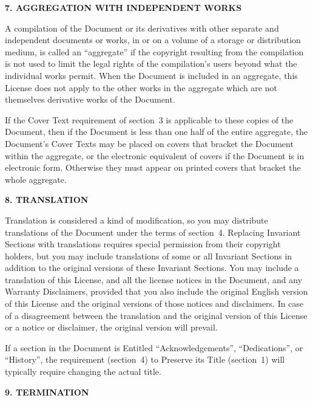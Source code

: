 \documentclass[a4paper,spanish,12pt]{book}
\begin{document}
\begin{center}
{\Large\bf 7. AGGREGATION WITH INDEPENDENT WORKS\par}
\end{center}


A compilation of the Document or its derivatives with other separate
and independent documents or works, in or on a volume of a storage or
distribution medium, is called an ``aggregate'' if the copyright
resulting from the compilation is not used to limit the legal rights
of the compilation's users beyond what the individual works permit.
When the Document is included in an aggregate, this License does not
apply to the other works in the aggregate which are not themselves
derivative works of the Document.

If the Cover Text requirement of section~3 is applicable to these
copies of the Document, then if the Document is less than one half of
the entire aggregate, the Document's Cover Texts may be placed on
covers that bracket the Document within the aggregate, or the
electronic equivalent of covers if the Document is in electronic form.
Otherwise they must appear on printed covers that bracket the whole
aggregate.


\begin{center}
{\Large\bf 8. TRANSLATION\par}
\end{center}


Translation is considered a kind of modification, so you may
distribute translations of the Document under the terms of section~4.
Replacing Invariant Sections with translations requires special
permission from their copyright holders, but you may include
translations of some or all Invariant Sections in addition to the
original versions of these Invariant Sections.  You may include a
translation of this License, and all the license notices in the
Document, and any Warranty Disclaimers, provided that you also include
the original English version of this License and the original versions
of those notices and disclaimers.  In case of a disagreement between
the translation and the original version of this License or a notice
or disclaimer, the original version will prevail.

If a section in the Document is Entitled ``Acknowledgements'',
``Dedications'', or ``History'', the requirement (section~4) to Preserve
its Title (section~1) will typically require changing the actual
title.


\begin{center}
{\Large\bf 9. TERMINATION\par}
\end{center}
\end{document}
